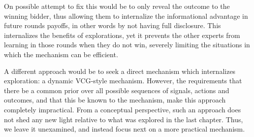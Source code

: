 On possible attempt to fix this would be to only reveal the outcome to the winning bidder, thus allowing them to internalize the informational advantage in future rounds payoffs, in other words by not having full disclosure.
This internalizes the benefits of explorations, yet it prevents the other experts from learning in those rounds when they do not win, severely limiting the situations in which the mechanism can be efficient.






A different approach would be to seek a direct mechanism which internalizes exploration: a dynamic VCG-style mechanism.
However, the requirements that there be a common prior over all possible sequences of signals, actions and outcomes, and that this be known to the mechanism, make this approach completely impractical. 
From a conceptual perspective, such an approach does not shed any new light relative to what was explored in the last chapter.
Thus, we leave it unexamined, and instead focus next on a more practical mechanism.


